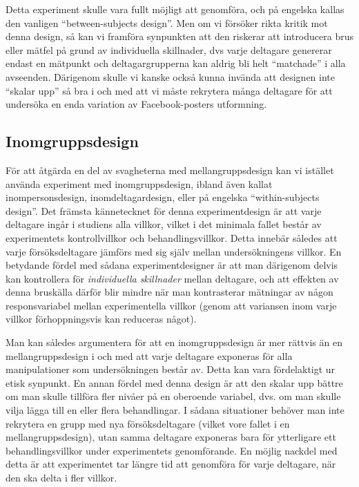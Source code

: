 \documentclass[
]{book}
\begin{document}
Detta experiment skulle vara fullt möjligt att genomföra, och på engelska kallas den vanligen ``between-subjects design''. Men om vi försöker rikta kritik mot denna design, så kan vi framföra synpunkten att den riskerar att introducera brus eller mätfel på grund av individuella skillnader, dvs varje deltagare genererar endast en mätpunkt och deltagargrupperna kan aldrig bli helt ``matchade'' i alla avseenden. Därigenom skulle vi kanske också kunna invända att designen inte ``skalar upp'' så bra i och med att vi måste rekrytera många deltagare för att undersöka en enda variation av Facebook-posters utformning.

\hypertarget{sub07.5.4}{%
\subsection{Inomgruppsdesign}\label{sub07.5.4}}

För att åtgärda en del av svagheterna med mellangruppsdesign kan vi istället använda experiment med inomgruppsdesign, ibland även kallat inompersonsdesign, inomdeltagardesign, eller på engelska ``within-subjects design''. Det främsta kännetecknet för denna experimentdesign är att varje deltagare ingår i studiens alla villkor, vilket i det minimala fallet består av experimentets kontrollvillkor och behandlingsvillkor. Detta innebär således att varje försöksdeltagare jämförs med sig själv mellan undersökningens villkor. En betydande fördel med sådana experimentdesigner är att man därigenom delvis kan kontrollera för \emph{individuella skillnader} mellan deltagare, och att effekten av denna bruskälla därför blir mindre när man kontrasterar mätningar av någon responsvariabel mellan experimentella villkor (genom att variansen inom varje villkor förhoppningsvis kan reduceras något).

Man kan således argumentera för att en inomgruppsdesign är mer rättvis än en mellangruppsdesign i och med att varje deltagare exponeras för alla manipulationer som undersökningen består av. Detta kan vara fördelaktigt ur etisk synpunkt. En annan fördel med denna design är att den skalar upp bättre om man skulle tillföra fler nivåer på en oberoende variabel, dvs. om man skulle vilja lägga till en eller flera behandlingar. I sådana situationer behöver man inte rekrytera en grupp med nya försöksdeltagare (vilket vore fallet i en mellangruppsdesign), utan samma deltagare exponeras bara för ytterligare ett behandlingsvillkor under experimentets genomförande. En möjlig nackdel med detta är att experimentet tar längre tid att genomföra för varje deltagare, när den ska delta i fler villkor.
\end{document}
